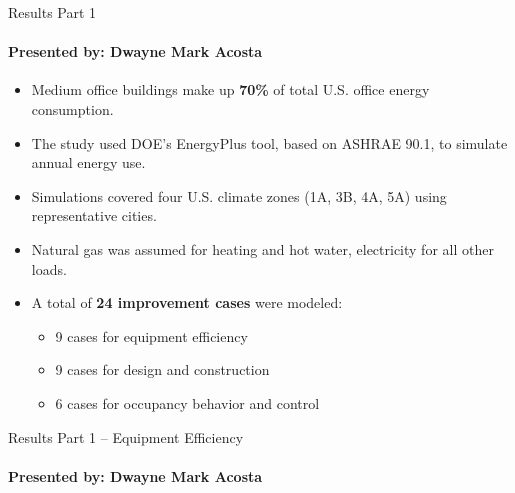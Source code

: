 \documentclass{beamer}
\begin{document}
\begin{frame}{Results Part 1}
\framesubtitle{Presented by: Dwayne Mark Acosta}

\begin{itemize}
    \item Medium office buildings make up \textbf{70\%} of total U.S. office energy consumption.
    \item The study used DOE's EnergyPlus tool, based on ASHRAE 90.1, to simulate annual energy use.
    \item Simulations covered four U.S. climate zones (1A, 3B, 4A, 5A) using representative cities.
    \item Natural gas was assumed for heating and hot water, electricity for all other loads.
    \item A total of \textbf{24 improvement cases} were modeled:
    \begin{itemize}
        \item 9 cases for equipment efficiency
        \item 9 cases for design and construction
        \item 6 cases for occupancy behavior and control
    \end{itemize}
\end{itemize}
\end{frame}

\begin{frame}{Results Part 1 – Equipment Efficiency}
    \framesubtitle{Presented by: Dwayne Mark Acosta}
    
    \scriptsize
    \begin{table}[h]
    \centering
    \caption{Equipment Efficiency Improvement Cases}
    \end{table}
    \end{frame}
\end{document}
